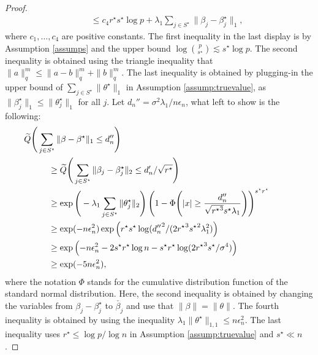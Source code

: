 \documentclass[pdftex, noinfoline, letter]{imsart}
\theoremstyle{plain}
\begin{document}
\begin{proof}
\begin{align}
    & \quad \leq c_4 r^\star s^\star \log p + \lambda_1 \sum_{j \in S^\star} \|\beta_j - \beta_j^\star\|_1,
        \label{bound-2}
\end{align}
where $c_1, \dots, c_4$ are positive constants. The first inequality in the last display is by Assumption \ref{assumps} and the upper bound $\log {p \choose s^\star} \lesssim s^\star \log p$. The second inequality is obtained using the triangle inequality that $\|a \|_q^m \leq \|a - b\|_q^m + \|b\|_q^m$.
The last inequality is obtained by plugging-in the upper bound of $\sum_{j \in S^\star} \|\theta^\star\|_1$ in Assumption \ref{assump:truevalue}, as $\|\beta^\star_j\|_1 \leq \|\theta^\star_j\|_1$ for all $j$.
Let $d_n'' = \sigma^2 \lambda_1/n\epsilon_n$, what left to show is the following:
\begin{align*}
&\hspace{-1cm}\widetilde{Q}
\Bigg(
\sum_{j \in S^\star} \|\beta - \beta^\star\|_1 \leq d_n''
\Bigg)\\
& \geq \widetilde{Q} \Bigg(
	\sum_{j \in S^\star} \|\beta_j - \beta_j^\star\|_2 \leq d_n'/\sqrt{r^\star}
\Bigg) \\
& \geq 
\exp \Bigg(-\lambda_1 \sum_{j \in S^\star} \|\theta_j^\star\|_2 \Bigg)
\left(1 - 
\Phi\Bigg(
|x| \geq \frac{d_n''}{\sqrt{{r^\star}^3}s^\star \lambda_1}\Bigg) \right)^{s^\star r^\star}\\
& \geq 
\exp(- n\epsilon_n^2) 
\exp\left(r^\star s^\star 
\log ({d_n''}^2 / (2{r^\star}^3 {s^\star}^2 \lambda_1^2)\right)\\
& \geq 
\exp\left(- n\epsilon_n^2 - 2s^\star r^\star \log n - s^\star r^\star 
\log (2{r^\star}^3 s^\star/\sigma^4)\right) \\ 
& \geq \exp(-5n\epsilon_n^2),
\end{align*}
where the notation $\Phi$ stands for the cumulative distribution function  of the standard normal distribution.
Here, the second inequality is obtained by changing the variables from $\beta_j-\beta^\star_j$ to $\check{\beta_j}$ and use that $\|\beta\| = \|\theta\|$.
The fourth inequality is obtained by using the inequality 
$\lambda_1 \|\theta^\star\|_{1,1} \leq n\epsilon^2_n$.
The last inequality uses $r^\star \leq \log p/\log n$ in Assumption \ref{assump:truevalue}
and $s^\star \ll n$.
\end{proof}
\end{document}
